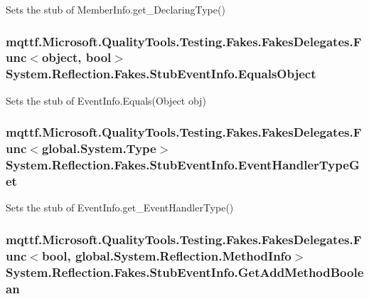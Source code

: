Sets the stub of Member\-Info.\-get\-\_\-\-Declaring\-Type()

\hypertarget{class_system_1_1_reflection_1_1_fakes_1_1_stub_event_info_aef8442ec5001daf83abcc053875a7bd0}{
\subsubsection[{Equals\-Object}]{\setlength{\rightskip}{0pt plus 5cm}mqttf.\-Microsoft.\-Quality\-Tools.\-Testing.\-Fakes.\-Fakes\-Delegates.\-Func$<$object, bool$>$ System.\-Reflection.\-Fakes.\-Stub\-Event\-Info.\-Equals\-Object}}\label{class_system_1_1_reflection_1_1_fakes_1_1_stub_event_info_aef8442ec5001daf83abcc053875a7bd0}


Sets the stub of Event\-Info.\-Equals(\-Object obj)

\hypertarget{class_system_1_1_reflection_1_1_fakes_1_1_stub_event_info_aa021551f738cb4f6d268c1ad733d8436}{
\subsubsection[{Event\-Handler\-Type\-Get}]{\setlength{\rightskip}{0pt plus 5cm}mqttf.\-Microsoft.\-Quality\-Tools.\-Testing.\-Fakes.\-Fakes\-Delegates.\-Func$<$global.\-System.\-Type$>$ System.\-Reflection.\-Fakes.\-Stub\-Event\-Info.\-Event\-Handler\-Type\-Get}}\label{class_system_1_1_reflection_1_1_fakes_1_1_stub_event_info_aa021551f738cb4f6d268c1ad733d8436}


Sets the stub of Event\-Info.\-get\-\_\-\-Event\-Handler\-Type()

\hypertarget{class_system_1_1_reflection_1_1_fakes_1_1_stub_event_info_ab0f8cbe1b352539dd034daca484e8233}{
\subsubsection[{Get\-Add\-Method\-Boolean}]{\setlength{\rightskip}{0pt plus 5cm}mqttf.\-Microsoft.\-Quality\-Tools.\-Testing.\-Fakes.\-Fakes\-Delegates.\-Func$<$bool, global.\-System.\-Reflection.\-Method\-Info$>$ System.\-Reflection.\-Fakes.\-Stub\-Event\-Info.\-Get\-Add\-Method\-Boolean}}\label{class_system_1_1_reflection_1_1_fakes_1_1_stub_event_info_ab0f8cbe1b352539dd034daca484e8233}


